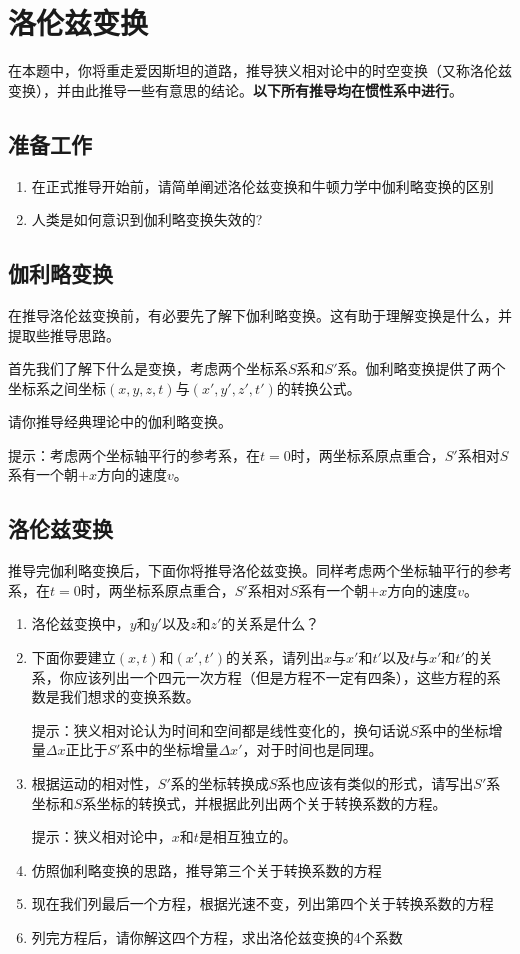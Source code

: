 \documentclass[UTF8]{ctexart}
\numberwithin{equation}{section}
\begin{document}
\section{洛伦兹变换}
在本题中，你将重走爱因斯坦的道路，推导狭义相对论中的时空变换（又称洛伦兹变换），并由此推导一些有意思的结论。\textbf{以下所有推导均在惯性系中进行}。
\subsection{准备工作}
\begin{enumerate}
    \item 在正式推导开始前，请简单阐述洛伦兹变换和牛顿力学中伽利略变换的区别
    \item 人类是如何意识到伽利略变换失效的?
\end{enumerate}
\subsection{伽利略变换}
在推导洛伦兹变换前，有必要先了解下伽利略变换。这有助于理解变换是什么，并提取些推导思路。

首先我们了解下什么是变换，考虑两个坐标系$S$系和$S'$系。伽利略变换提供了两个坐标系之间坐标$(x,y,z,t)$与$(x',y',z',t')$的转换公式。

请你推导经典理论中的伽利略变换。

提示：考虑两个坐标轴平行的参考系，在$t = 0$时，两坐标系原点重合，$S'$系相对$S$系有一个朝$+x$方向的速度$v$。

\subsection{洛伦兹变换}
推导完伽利略变换后，下面你将推导洛伦兹变换。同样考虑两个坐标轴平行的参考系，在$t = 0$时，两坐标系原点重合，$S'$系相对$S$系有一个朝$+x$方向的速度$v$。
\begin{enumerate}
    \item 洛伦兹变换中，$y$和$y'$以及$z$和$z'$的关系是什么？
    \item 下面你要建立$(x,t)$和$(x',t')$的关系，请列出$x$与$x'$和$t'$以及$t$与$x'$和$t'$的关系，你应该列出一个四元一次方程（但是方程不一定有四条），这些方程的系数是我们想求的变换系数。
    
    提示：狭义相对论认为时间和空间都是线性变化的，换句话说$S$系中的坐标增量$\Delta x$正比于$S'$系中的坐标增量$\Delta x'$，对于时间也是同理。

    \item 根据运动的相对性，$S'$系的坐标转换成$S$系也应该有类似的形式，请写出$S'$系坐标和$S$系坐标的转换式，并根据此列出两个关于转换系数的方程。
    
    提示：狭义相对论中，$x$和$t$是相互独立的。

    \item 仿照伽利略变换的思路，推导第三个关于转换系数的方程
    
    \item 现在我们列最后一个方程，根据光速不变，列出第四个关于转换系数的方程
    
    \item 列完方程后，请你解这四个方程，求出洛伦兹变换的4个系数
\end{enumerate}
\end{document}
